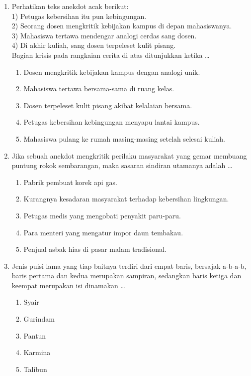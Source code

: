 \documentclass[12pt,a4paper]{article}
\begin{document}
\begin{enumerate}[leftmargin=*]
\item Perhatikan teks anekdot acak berikut:\\
1) Petugas kebersihan itu pun kebingungan.\\
2) Seorang dosen mengkritik kebijakan kampus di depan mahasiswanya.\\
3) Mahasiswa tertawa mendengar analogi cerdas sang dosen.\\
4) Di akhir kuliah, sang dosen terpeleset kulit pisang.\\
Bagian krisis pada rangkaian cerita di atas ditunjukkan ketika \dots
    \begin{enumerate}[label=\alph*.]
        \item Dosen mengkritik kebijakan kampus dengan analogi unik.
        \item Mahasiswa tertawa bersama-sama di ruang kelas.
        \item Dosen terpeleset kulit pisang akibat kelalaian bersama.
        \item Petugas kebersihan kebingungan menyapu lantai kampus.
        \item Mahasiswa pulang ke rumah masing-masing setelah selesai kuliah.
    \end{enumerate}

\item Jika sebuah anekdot mengkritik perilaku masyarakat yang gemar membuang puntung rokok sembarangan, maka sasaran sindiran utamanya adalah \dots
    \begin{enumerate}[label=\alph*.]
        \item Pabrik pembuat korek api gas.
        \item Kurangnya kesadaran masyarakat terhadap kebersihan lingkungan.
        \item Petugas medis yang mengobati penyakit paru-paru.
        \item Para menteri yang mengatur impor daun tembakau.
        \item Penjual asbak hias di pasar malam tradisional.
    \end{enumerate}



\item Jenis puisi lama yang tiap baitnya terdiri dari empat baris, bersajak a-b-a-b, baris pertama dan kedua merupakan sampiran, sedangkan baris ketiga dan keempat merupakan isi dinamakan \dots
    \begin{enumerate}[label=\alph*.]
        \item Syair
        \item Gurindam
        \item Pantun
        \item Karmina
        \item Talibun
    \end{enumerate}


\end{enumerate}
\end{document}

